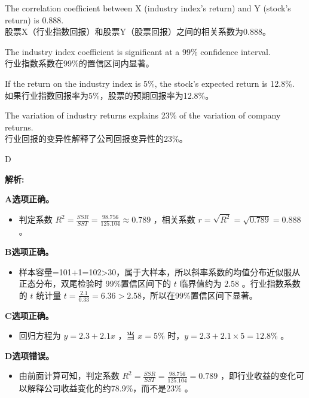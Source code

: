 \documentclass{article}
\newenvironment{explanation}
{\textbf{解析:}\par}
{\par}
\begin{document}
    \begin{choices}
        \item The correlation coefficient between X (industry index’s return) and Y (stock’s return) is 0.888.\\
        股票X（行业指数回报）和股票Y（股票回报）之间的相关系数为0.888。
        \item The industry index coefficient is significant at a 99\% confidence interval.\\
        行业指数系数在99\%的置信区间内显著。
        \item If the return on the industry index is 5\%, the stock's expected return is 12.8\%.\\
        如果行业指数回报率为5\%，股票的预期回报率为12.8\%。
        \item The variation of industry returns explains 23\% of the variation of company returns.\\
        行业回报的变异性解释了公司回报变异性的23\%。
    \end{choices}
    
    \begin{correctanswer}
    D
    \end{correctanswer}
    
    \begin{explanation}
    \textbf{A选项正确。}
    \begin{itemize}
    \item 判定系数 \(R^{2}=\frac{SSR}{SST}=\frac{98.756}{125.104}\approx0.789\) ，相关系数 \(r = \sqrt{R^{2}}=\sqrt{0.789}=0.888\) 。
    \end{itemize}
    \textbf{B选项正确。}
    \begin{itemize}
    \item 样本容量=101+1=102>30，属于大样本，所以斜率系数的均值分布近似服从正态分布，双尾检验时 99\%置信区间下的 \(t\) 临界值约为 \(2.58\) 。行业指数系数的 \(t\) 统计量 \(t=\frac{2.1}{0.33}=6.36>2.58\)，所以在99\%置信区间下显著。
    \end{itemize}
    \textbf{C选项正确。}
    \begin{itemize}
    \item 回归方程为 \(y = 2.3+2.1x\) ，当 \(x = 5\%\) 时，\(y=2.3 + 2.1\times5=12.8\%\) 。
    \end{itemize}
    \textbf{D选项错误。}
    \begin{itemize}
    \item 由前面计算可知，判定系数 \(R^{2}=\frac{SSR}{SST}=\frac{98.756}{125.104}=0.789\) ，即行业收益的变化可以解释公司收益变化的约78.9\%，而不是23\% 。
    \end{itemize}
    \end{explanation}
    
\end{document}
